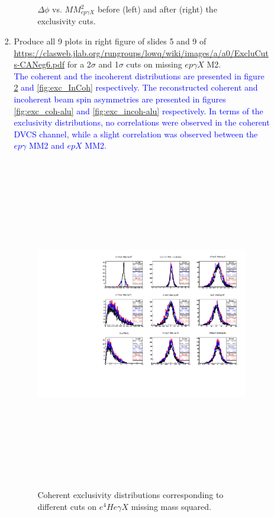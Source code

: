\begin{enumerate}
\begin{enumerate}
\begin{enumerate}
\begin{figure}[!h]
    \caption{ $\Delta \phi$ vs. $MM^{2}_{ep\gamma X}$ before (left) and 
    after (right) the exclusivity cuts.}
    \label{fig:2d_delta_phi_MM2_InCoh}
    \end{figure}                                                                  


  \item Produce all 9 plots in right figure of slides 5 and 9 of \url{ 
     https://clasweb.jlab.org/rungroups/lowq/wiki/images/a/a0/ExcluCuts-CANeg6.pdf}   
     for a 2$\sigma$ and 1$\sigma$ cuts on missing $ep\gamma X$ M2.\\
     \textcolor{blue}{The coherent and the incoherent distributions are 
        presented in figure \ref{fig:exc_Coh} and \ref{fig:exc_InCoh} 
     respectively. The reconstructed coherent and incoherent beam spin 
  asymmetries are presented in figures \ref{fig:exc_coh-alu} and 
  \ref{fig:exc_incoh-alu} respectively. In terms of the exclusivity 
  distributions, no correlations were observed in the coherent DVCS channel, 
  while a slight correlation was observed between the $ep\gamma$ MM2 and $epX$ 
  MM2.}

  \begin{figure}[tbp]
    \includegraphics[height=14.6cm]{fig/all_sigmas_coh_exc_cuts.pdf}
    \caption{Coherent exclusivity distributions corresponding to different cuts 
    on $e^{4}He\gamma X$ missing mass squared.}
    \label{fig:exc_Coh}
    \end{figure}


\end{enumerate}
\end{enumerate}
\end{enumerate}
